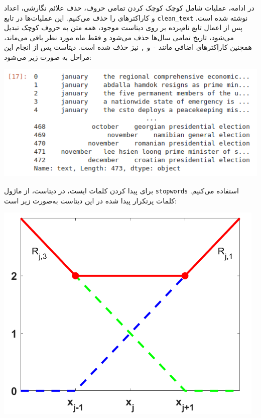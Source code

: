 \begin{enumerate}
\begin{qsolve}
	در ادامه، عملیات  شامل کوچک کوچک کردن تمامی حروف، حذف علائم نگارشی، اعداد و کاراکترهای  را حذف می‌کنیم. این عملیات‌ها در تابع \texttt{clean\_text} نوشته شده است. پس از اعمال تابع نام‌برده بر روی دیتاست موجود، همه متن به حروف کوچک تبدیل می‌شود، تاریخ تمامی سال‌ها حذف می‌شود و فقط ماه‌ مورد نظر باقی می‌ماند، همچنین کاراکتر‌های اضافی مانند \texttt{-} و \texttt{,} نیز حذف شده است. دیتاست پس از انجام این مراحل به صورت زیر می‌شود:
	
	\begin{center}
		\includegraphics*[width=0.8\linewidth]{pics/img10.png}
		\label{دیتاست ورودی پس از حذف علائم نگارشی و کوچک سازی کلمات}
	\end{center}
	
	
	\end{qsolve}
	
	
	
	
	
	
	
	\begin{qsolve}
		برای پیدا کردن کلمات ایست، در دیتاست، از ماژول \texttt{stopwords} استفاده می‌کنیم. کلمات پرتکرار پیدا شده در این دیتاست به‌صورت زیر است:
		
		
		\begin{center}
			\includegraphics*[width=1\linewidth]{pics/img11.png}
			\label{کلمات ایست}
		\end{center}
		

\end{qsolve}
\end{enumerate}
